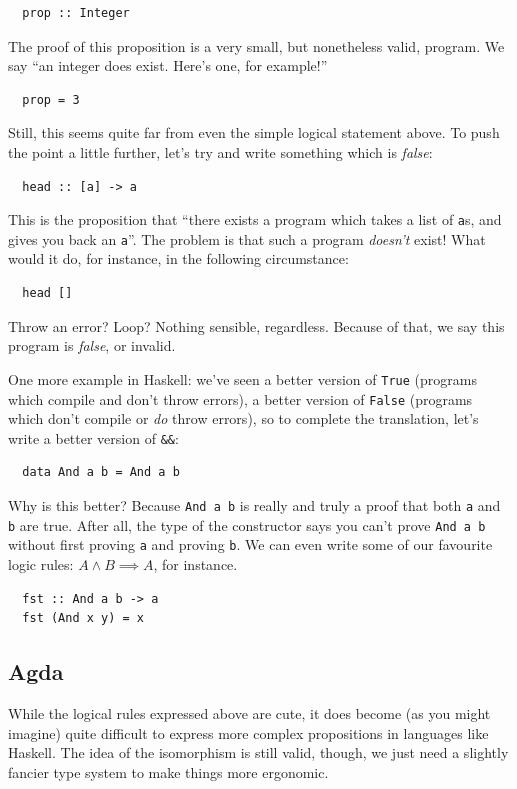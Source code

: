 \documentclass[acmsmall, screen, nonacm, timestamp, review]{acmart}
\theoremstyle{definition}
\theoremstyle{definition}
\begin{document}
\begin{verbatim}
  prop :: Integer
\end{verbatim}

The proof of this proposition is a very small, but nonetheless valid, program.
We say ``an integer does exist. Here's one, for example!''

\begin{verbatim}
  prop = 3
\end{verbatim}

Still, this seems quite far from even the simple logical statement above. To
push the point a little further, let's try and write something which is
\emph{false}:
\begin{verbatim}
  head :: [a] -> a
\end{verbatim}
This is the proposition that ``there exists a program which takes a list of
\verb+a+s, and gives you back an \verb+a+''. The problem is that such a program
\emph{doesn't} exist! What would it do, for instance, in the following
circumstance:
\begin{verbatim}
  head []
\end{verbatim}
Throw an error? Loop? Nothing sensible, regardless. Because of that, we say this
program is \emph{false}, or invalid.

One more example in Haskell: we've seen a better version of \verb+True+
(programs which compile and don't throw errors), a better version of
\verb+False+ (programs which don't compile or \emph{do} throw errors), so to
complete the translation, let's write a better version of \verb+&&+:
\begin{verbatim}
  data And a b = And a b
\end{verbatim}

Why is this better? Because \verb+And a b+ is really and truly a proof that both
\verb+a+ and \verb+b+ are true. After all, the type of the constructor says you
can't prove \verb+And a b+ without first proving \verb+a+ and proving \verb+b+.
We can even write some of our favourite logic rules: \( A \wedge B \implies A
\), for instance.
\begin{verbatim}
  fst :: And a b -> a
  fst (And x y) = x
\end{verbatim}
\subsection{Agda}
While the logical rules expressed above are cute, it does become (as you might
imagine) quite difficult to express more complex propositions in languages like
Haskell. The idea of the isomorphism is still valid, though, we just need a
slightly fancier type system to make things more ergonomic.
\end{document}
